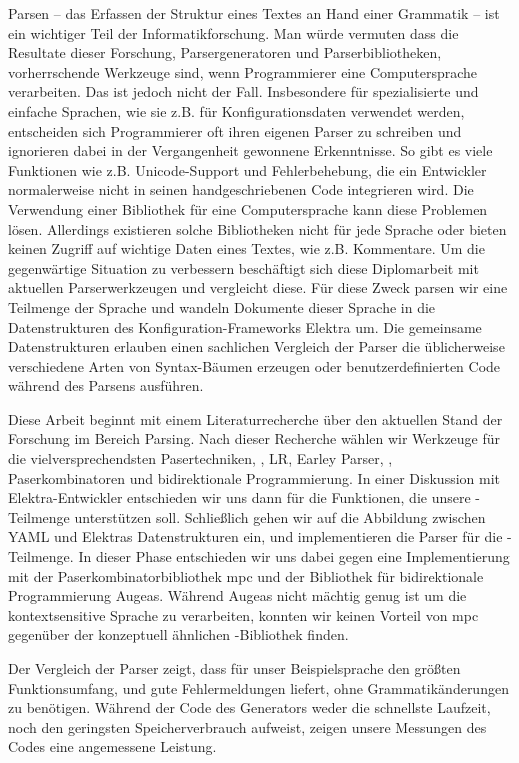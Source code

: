 \begin{kurzfassung}
Parsen – das Erfassen der Struktur eines Textes an Hand einer Grammatik – ist ein wichtiger Teil der Informatikforschung. Man würde vermuten dass die Resultate dieser Forschung, Parsergeneratoren und Parserbibliotheken, vorherrschende Werkzeuge sind, wenn Programmierer eine Computersprache verarbeiten. Das ist jedoch nicht der Fall. Insbesondere für spezialisierte und einfache Sprachen, wie sie z.B. für Konfigurationsdaten verwendet werden, entscheiden sich Programmierer oft ihren eigenen Parser zu schreiben und ignorieren dabei in der Vergangenheit gewonnene Erkenntnisse. So gibt es viele Funktionen wie z.B. Unicode-Support und Fehlerbehebung, die ein Entwickler normalerweise nicht in seinen handgeschriebenen Code integrieren wird. Die Verwendung einer Bibliothek für eine Computersprache kann diese Problemen lösen. Allerdings existieren solche Bibliotheken nicht für jede Sprache oder bieten keinen Zugriff auf wichtige Daten eines Textes, wie z.B. Kommentare. Um die gegenwärtige Situation zu verbessern beschäftigt sich diese Diplomarbeit mit aktuellen Parserwerkzeugen und vergleicht diese. Für diese Zweck parsen wir eine Teilmenge der Sprache  und wandeln Dokumente dieser Sprache in die Datenstrukturen des Konfiguration-Frameworks Elektra um. Die gemeinsame Datenstrukturen erlauben einen sachlichen Vergleich der Parser die üblicherweise verschiedene Arten von Syntax-Bäumen erzeugen oder benutzerdefinierten Code während des Parsens ausführen.

Diese Arbeit beginnt mit einem Literaturrecherche über den aktuellen Stand der Forschung im Bereich Parsing. Nach dieser Recherche wählen wir Werkzeuge für die vielversprechendsten Pasertechniken, , LR, Earley Parser, , Paserkombinatoren und bidirektionale Programmierung. In einer Diskussion mit Elektra-Entwickler entschieden wir uns dann für die Funktionen, die unsere -Teilmenge unterstützen soll. Schließlich gehen wir auf die Abbildung zwischen YAML und Elektras Datenstrukturen ein, und implementieren die Parser für die -Teilmenge. In dieser Phase entschieden wir uns dabei gegen eine Implementierung mit der Paserkombinatorbibliothek mpc und der Bibliothek für bidirektionale Programmierung Augeas. Während Augeas nicht mächtig genug ist um die kontextsensitive Sprache  zu verarbeiten, konnten wir keinen Vorteil von mpc gegenüber der konzeptuell ähnlichen -Bibliothek  finden.

Der Vergleich der Parser zeigt, dass für unser Beispielsprache  den größten Funktionsumfang, und gute Fehlermeldungen liefert, ohne Grammatikänderungen zu benötigen. Während der Code des Generators weder die schnellste Laufzeit, noch den geringsten Speicherverbrauch aufweist, zeigen unsere Messungen des Codes eine angemessene Leistung.
\end{kurzfassung}
